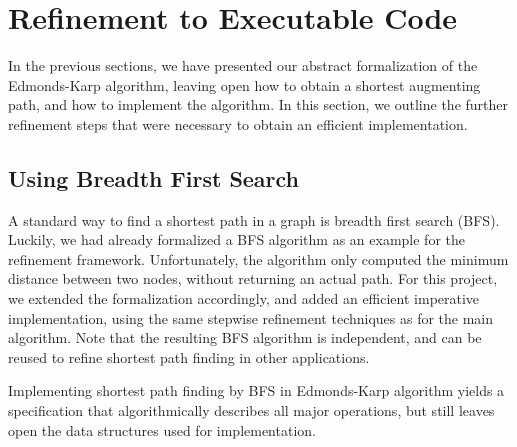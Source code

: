 \documentclass{llncs}
\begin{document}
    
\section{Refinement to Executable Code}\label{sec:executable}
  In the previous sections, we have presented our abstract formalization of the Edmonds-Karp algorithm,
  leaving open how to obtain a shortest augmenting path, and how to implement the algorithm. 
  In this section, we outline the further refinement steps that were necessary to obtain an efficient implementation.

  \subsection{Using Breadth First Search}
  A standard way to find a shortest path in a graph is breadth first search (BFS). Luckily, we had already formalized a BFS algorithm as an example for the refinement framework. Unfortunately, the algorithm only computed the minimum distance between two nodes, without returning an actual path. For this project, we extended the formalization accordingly, and added an efficient imperative implementation, using the same stepwise refinement techniques as for the main algorithm. Note that the resulting BFS algorithm is independent, and can be reused to refine shortest path finding in other applications. 
  
  Implementing shortest path finding by BFS in Edmonds-Karp algorithm yields a specification that algorithmically describes all major operations, but still leaves open the data structures used for implementation.
  
\end{document}
